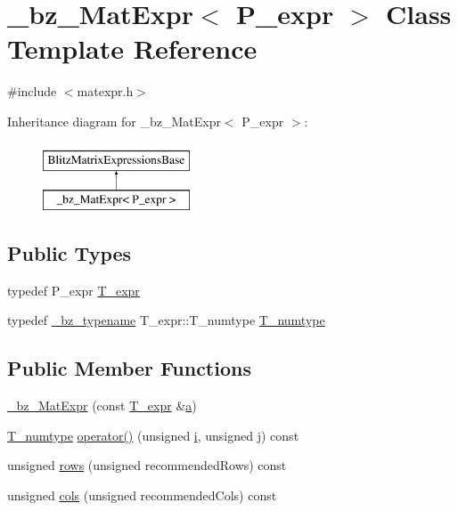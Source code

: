 \hypertarget{class__bz__MatExpr}{}\section{\+\_\+bz\+\_\+\+Mat\+Expr$<$ P\+\_\+expr $>$ Class Template Reference}
\label{class__bz__MatExpr}


{\ttfamily \#include $<$matexpr.\+h$>$}

Inheritance diagram for \+\_\+bz\+\_\+\+Mat\+Expr$<$ P\+\_\+expr $>$\+:\begin{figure}[H]
\begin{center}
\leavevmode
\includegraphics[height=2.000000cm]{class__bz__MatExpr}
\end{center}
\end{figure}
\subsection*{Public Types}
\begin{DoxyCompactItemize}
\item 
typedef P\+\_\+expr \hyperlink{class__bz__MatExpr_a6e206a599d2c0bd5d76a395aebfb48df}{T\+\_\+expr}
\item 
typedef \hyperlink{compiler_8h_a1bc40add3e72effc9cf69dbe445cbdfd}{\+\_\+bz\+\_\+typename} T\+\_\+expr\+::\+T\+\_\+numtype \hyperlink{class__bz__MatExpr_ad75e784a0780247c7017d43a220beb4f}{T\+\_\+numtype}
\end{DoxyCompactItemize}
\subsection*{Public Member Functions}
\begin{DoxyCompactItemize}
\item 
\hyperlink{class__bz__MatExpr_aa7a1317799ca4bd1303a1fe1d8cfa8d5}{\+\_\+bz\+\_\+\+Mat\+Expr} (const \hyperlink{class__bz__MatExpr_a6e206a599d2c0bd5d76a395aebfb48df}{T\+\_\+expr} \&\hyperlink{gen__mat5files_8m_aae328bf20413f220e38aec4d95bfd6da}{a})
\item 
\hyperlink{class__bz__MatExpr_ad75e784a0780247c7017d43a220beb4f}{T\+\_\+numtype} \hyperlink{class__bz__MatExpr_a8e2d850026d5e024155c36fe22536c7f}{operator()} (unsigned \hyperlink{indexexpr_8h_aabd77643995707c185e95c8cb2782c81}{i}, unsigned \hyperlink{indexexpr_8h_aa1f3325d66516548e69238097857fa98}{j}) const 
\item 
unsigned \hyperlink{class__bz__MatExpr_a62deedf006716ff627dc4340e78fb5b9}{rows} (unsigned recommended\+Rows) const 
\item 
unsigned \hyperlink{class__bz__MatExpr_ab513fd5e938688b27ce21711e3a8b7ba}{cols} (unsigned recommended\+Cols) const 
\end{DoxyCompactItemize}


